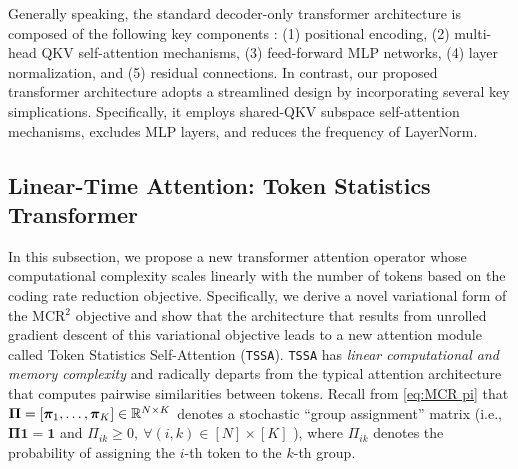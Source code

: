 \documentclass[../../book-main.tex]{subfiles}
\begin{document}
Generally speaking, the standard decoder-only transformer architecture is composed of the following key components \cite{vaswani2017attention}: (1)  positional encoding, (2) multi-head QKV self-attention mechanisms, (3) feed-forward MLP networks, (4) layer normalization, and (5) residual connections. In contrast, our proposed transformer architecture adopts a streamlined design by incorporating several key simplications. Specifically, it employs shared-QKV subspace self-attention mechanisms, excludes MLP layers, and reduces the frequency of LayerNorm.










\subsection{Linear-Time Attention: Token Statistics Transformer}\label{sub:tost} 

In this subsection, we propose a new transformer attention operator whose computational complexity scales linearly with the number of tokens based on the coding rate reduction objective.  Specifically, we derive a novel variational form of the MCR$^2$ objective and show that the architecture that results from unrolled gradient descent of this variational objective leads to a new attention module called Token Statistics Self-Attention (\texttt{TSSA}). \texttt{TSSA} has {\em linear computational and memory complexity} and radically departs from the typical attention architecture that computes pairwise similarities between tokens.  Recall from \eqref{eq:MCR pi} that $\bm \Pi = [\bm \pi_1, \ldots, \bm \pi_K] \in \mathbb{R}^{N \times K}$ denotes a stochastic ``group assignment'' matrix (i.e., $\bm \Pi \bm 1 = \bm 1$ and $\Pi_{ik} \geq 0, \  \forall (i,k) \in [N] \times [K]$ ), where $\Pi_{ik}$ denotes the probability of assigning the $i$-th token to the $k$-th group. 
\end{document}
